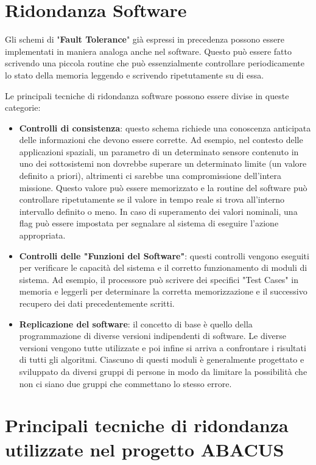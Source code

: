 \documentclass[LaM,binding=0.6cm,oneside]{../sapthesis}
\begin{document}
\section{ Ridondanza Software}
Gli schemi di "\textbf{Fault Tolerance}" già espressi in precedenza possono essere implementati in maniera analoga anche nel software.
Questo può essere fatto scrivendo una piccola routine che può essenzialmente controllare periodicamente lo stato della memoria leggendo e scrivendo ripetutamente su di essa. 

Le principali tecniche di ridondanza software possono essere divise in queste categorie:
\begin{itemize}
    \item \textbf{Controlli di consistenza}: questo schema richiede una conoscenza anticipata delle informazioni che devono essere corrette. Ad esempio, nel contesto delle applicazioni spaziali, un parametro di un determinato sensore contenuto in uno dei sottosistemi non dovrebbe superare un determinato limite (un valore definito a priori), altrimenti ci sarebbe una compromissione dell'intera missione. Questo valore può essere memorizzato e la routine del software può controllare ripetutamente se il valore in tempo reale si trova all'interno intervallo definito o meno. In caso di superamento dei valori nominali, una flag può essere impostata per segnalare al sistema di eseguire l'azione appropriata.
    
    \item \textbf{Controlli delle "Funzioni del Software"}: questi controlli vengono eseguiti per verificare le capacità del sistema e il corretto funzionamento di moduli di sistema. Ad esempio, il processore può scrivere dei specifici "Test Cases" in memoria e
    leggerli per determinare la corretta memorizzazione e il successivo recupero dei dati precedentemente scritti.

    \item \textbf{Replicazione del software}: il concetto di base è quello della programmazione di diverse versioni indipendenti di software.
    Le diverse versioni vengono tutte utilizzate e poi infine si arriva a confrontare i risultati di tutti gli algoritmi. Ciascuno di questi moduli è generalmente progettato e sviluppato da
    diversi gruppi di persone in modo da limitare la possibilità che non ci siano due gruppi che commettano lo stesso errore.

\end{itemize}

\section{Principali tecniche di ridondanza utilizzate nel progetto ABACUS}
\end{document}
